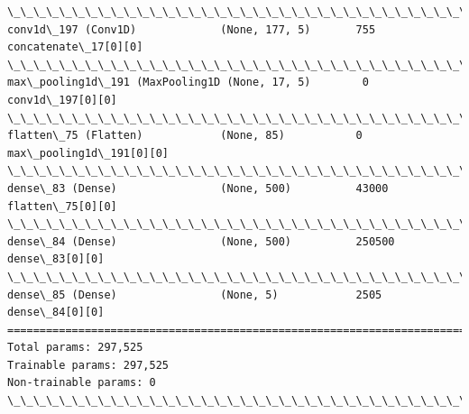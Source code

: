 \documentclass[11pt]{article}
\begin{document}
\begin{Verbatim}[commandchars=\\\{\}]
\_\_\_\_\_\_\_\_\_\_\_\_\_\_\_\_\_\_\_\_\_\_\_\_\_\_\_\_\_\_\_\_\_\_\_\_\_\_\_\_\_\_\_\_\_\_\_\_\_\_\_\_\_\_\_\_\_\_\_\_\_\_\_\_\_\_\_\_\_\_\_\_\_\_\_\_\_\_\_\_\_\_\_\_\_\_\_\_\_\_\_\_\_\_\_\_\_\_
conv1d\_197 (Conv1D)             (None, 177, 5)       755         concatenate\_17[0][0]             
\_\_\_\_\_\_\_\_\_\_\_\_\_\_\_\_\_\_\_\_\_\_\_\_\_\_\_\_\_\_\_\_\_\_\_\_\_\_\_\_\_\_\_\_\_\_\_\_\_\_\_\_\_\_\_\_\_\_\_\_\_\_\_\_\_\_\_\_\_\_\_\_\_\_\_\_\_\_\_\_\_\_\_\_\_\_\_\_\_\_\_\_\_\_\_\_\_\_
max\_pooling1d\_191 (MaxPooling1D (None, 17, 5)        0           conv1d\_197[0][0]                 
\_\_\_\_\_\_\_\_\_\_\_\_\_\_\_\_\_\_\_\_\_\_\_\_\_\_\_\_\_\_\_\_\_\_\_\_\_\_\_\_\_\_\_\_\_\_\_\_\_\_\_\_\_\_\_\_\_\_\_\_\_\_\_\_\_\_\_\_\_\_\_\_\_\_\_\_\_\_\_\_\_\_\_\_\_\_\_\_\_\_\_\_\_\_\_\_\_\_
flatten\_75 (Flatten)            (None, 85)           0           max\_pooling1d\_191[0][0]          
\_\_\_\_\_\_\_\_\_\_\_\_\_\_\_\_\_\_\_\_\_\_\_\_\_\_\_\_\_\_\_\_\_\_\_\_\_\_\_\_\_\_\_\_\_\_\_\_\_\_\_\_\_\_\_\_\_\_\_\_\_\_\_\_\_\_\_\_\_\_\_\_\_\_\_\_\_\_\_\_\_\_\_\_\_\_\_\_\_\_\_\_\_\_\_\_\_\_
dense\_83 (Dense)                (None, 500)          43000       flatten\_75[0][0]                 
\_\_\_\_\_\_\_\_\_\_\_\_\_\_\_\_\_\_\_\_\_\_\_\_\_\_\_\_\_\_\_\_\_\_\_\_\_\_\_\_\_\_\_\_\_\_\_\_\_\_\_\_\_\_\_\_\_\_\_\_\_\_\_\_\_\_\_\_\_\_\_\_\_\_\_\_\_\_\_\_\_\_\_\_\_\_\_\_\_\_\_\_\_\_\_\_\_\_
dense\_84 (Dense)                (None, 500)          250500      dense\_83[0][0]                   
\_\_\_\_\_\_\_\_\_\_\_\_\_\_\_\_\_\_\_\_\_\_\_\_\_\_\_\_\_\_\_\_\_\_\_\_\_\_\_\_\_\_\_\_\_\_\_\_\_\_\_\_\_\_\_\_\_\_\_\_\_\_\_\_\_\_\_\_\_\_\_\_\_\_\_\_\_\_\_\_\_\_\_\_\_\_\_\_\_\_\_\_\_\_\_\_\_\_
dense\_85 (Dense)                (None, 5)            2505        dense\_84[0][0]                   
==================================================================================================
Total params: 297,525
Trainable params: 297,525
Non-trainable params: 0
\_\_\_\_\_\_\_\_\_\_\_\_\_\_\_\_\_\_\_\_\_\_\_\_\_\_\_\_\_\_\_\_\_\_\_\_\_\_\_\_\_\_\_\_\_\_\_\_\_\_\_\_\_\_\_\_\_\_\_\_\_\_\_\_\_\_\_\_\_\_\_\_\_\_\_\_\_\_\_\_\_\_\_\_\_\_\_\_\_\_\_\_\_\_\_\_\_\_

    \end{Verbatim}

    \begin{center}
    \end{center}
    { \hspace*{\fill} \\}
    
\end{document}
